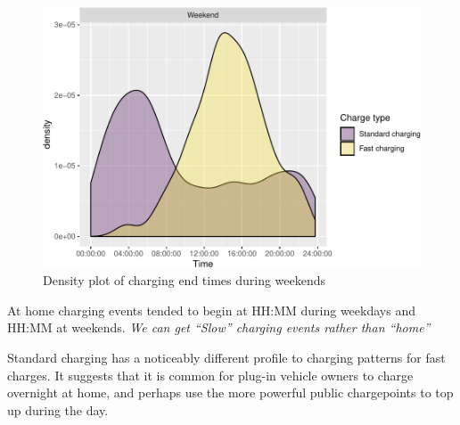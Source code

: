 \documentclass[]{article}
\newenvironment{Shaded}{\begin{snugshade}}{\end{snugshade}}
\newcommand{\KeywordTok}[1]{\textcolor[rgb]{0.13,0.29,0.53}{\textbf{#1}}}
\newcommand{\DataTypeTok}[1]{\textcolor[rgb]{0.13,0.29,0.53}{#1}}
\newcommand{\FloatTok}[1]{\textcolor[rgb]{0.00,0.00,0.81}{#1}}
\newcommand{\StringTok}[1]{\textcolor[rgb]{0.31,0.60,0.02}{#1}}
\newcommand{\OperatorTok}[1]{\textcolor[rgb]{0.81,0.36,0.00}{\textbf{#1}}}
\newcommand{\NormalTok}[1]{#1}
\begin{document}
\begin{Shaded}
\end{Shaded}

\begin{figure}
\centering
\includegraphics{EVBB_SummaryReport_files/figure-latex/chargeEndsWeekend-1.pdf}
\caption{\label{fig:chargeEndsWeekend}Density plot of charging end times
during weekends}
\end{figure}

At home charging events tended to begin at HH:MM during weekdays and
HH:MM at weekends. \emph{We can get ``Slow'' charging events rather than
``home''}

Standard charging has a noticeably different profile to charging
patterns for fast charges. It suggests that it is common for plug-in
vehicle owners to charge overnight at home, and perhaps use the more
powerful public chargepoints to top up during the day.
\end{document}
